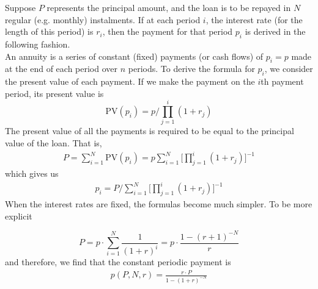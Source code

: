 \documentclass[11pt]{article}
\begin{document}
Suppose $P$ represents the principal amount, and the loan is to be repayed in $N$ regular (e.g. monthly) instalments. If at each period $i$, the interest rate (for the length of this period) is $r_i$, then the payment for that period $p_i$ is derived in the following fashion.\\

An annuity is a series of constant (fixed) payments (or cash flows) of $p_i=p$ made at the end of each period over $n$ periods. To derive the formula for $p_i$, we consider the present value of each payment. If we make the payment on the $i$th payment period, its present value is 
$$\text{PV}(p_i)=p\bigg/\prod_{j=1}^i(1+r_j)$$
The present value of all the payments is required to be equal to the principal value of the loan. That is,
\begin{align}
	P=\sum_{i=1}^N\text{PV}(p_i)=p\sum_{i=1}^N\bigg[\prod_{j=1}^i(1+r_j)\bigg]^{-1}\nonumber
\end{align}
which gives us 
\begin{align}
	p_i=P\bigg/\sum_{i=1}^N\bigg[\prod_{j=1}^i(1+r_j)\bigg]^{-1}\label{annuity_der}
\end{align}
When the interest rates are fixed, the formulas become much simpler. To be more explicit

$$P=p\cdot \sum_{i=1}^N\frac{1}{(1+r)^i}=p\cdot\frac{1-(r+1)^{-N}}{r}$$
and therefore, we find that the constant periodic payment is
\begin{align}
	p(P, N, r)=\frac{r\cdot P}{1-(1+r)^{-N}}\label{annuity_payment}
\end{align}
\\
\end{document}

